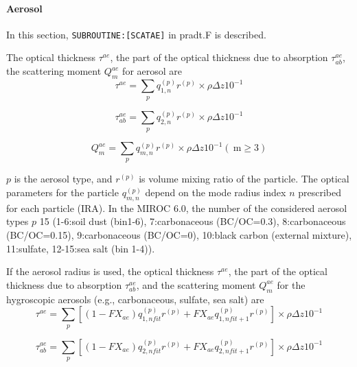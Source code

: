 \hypertarget{aerosol}{%
\paragraph{Aerosol}\label{aerosol}}

In this section, \texttt{SUBROUTINE:{[}SCATAE{]}} in pradt.F is
described.

The optical thickness \(\tau^{a e}\), the part of the optical thickness
due to absorption \(\tau_{ab}^{a e}\), the scattering moment
\(Q_{m}^{a e}\) for aerosol are \begin{equation}
\tau^{a e}=\sum_{p} q_{1, n}^{(p)} r^{(p)} \times \rho \Delta z 10^{-1}
\end{equation}

\begin{equation}
\tau_{ab}^{a e}=\sum_{p} q_{2, n}^{(p)} r^{(p)} \times \rho \Delta z 10^{-1}
\end{equation}

\begin{equation}
Q_{m}^{a e}=\sum_{p} q_{m, n}^{(p)} r^{(p)} \times \rho \Delta z 10^{-1} (\mathrm{~m} \geq 3)
\end{equation}

\(p\) is the aerosol type, and \(r^{(p)}\) is volume mixing ratio of the
particle. The optical parameters for the particle \(q_{m, n}^{(p)}\)
depend on the mode radius index \(n\) prescribed for each particle
(IRA). In the MIROC 6.0, the number of the considered aerosol types
\(p\) 15 (1-6:soil dust (bin1-6), 7:carbonaceous (BC/OC=0.3),
8:carbonaceous (BC/OC=0.15), 9:carbonaceous (BC/OC=0), 10:black carbon
(external mixture), 11:sulfate, 12-15:sea salt (bin 1-4)).

If the aerosol radius is used, the optical thickness \(\tau^{a e}\), the
part of the optical thickness due to absorption \(\tau_{ab}^{a e}\), and
the scattering moment \(Q_{m}^{a e}\) for the hygroscopic aerosols
(e.g., carbonaceous, sulfate, sea salt) are \begin{equation}
\tau^{a e}=\sum_{p}\left[\left(1-F X_{a e}\right) q_{1, n f i t}^{(p)} r^{(p)}+F X_{a e} q_{1, n f i t+1}^{(p)} r^{(p)}\right] \times \rho \Delta z 10^{-1}
\end{equation}

\begin{equation}
\tau_{ab}^{a e}=\sum_{p}\left[\left(1-F X_{a e}\right) q_{2, n f i t}^{(p)} r^{(p)}+F X_{a e} q_{2, n f i t+1}^{(p)} r^{(p)}\right] \times \rho \Delta z 10^{-1}
\end{equation}

